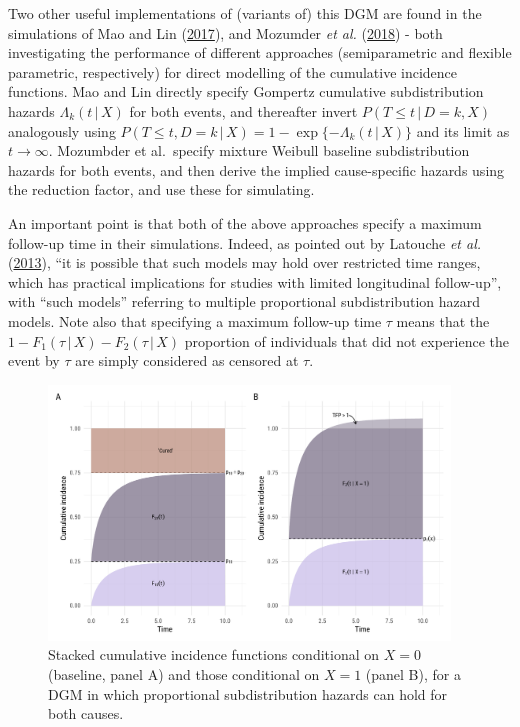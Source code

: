\documentclass[
  letterpaper,
  DIV=11,
  numbers=noendperiod]{scrreprt}
\newcommand{\given}{\,|\,}
\begin{document}
Two other useful implementations of (variants of) this DGM are found in
the simulations of Mao and Lin
(\protect\hyperlink{ref-maoEfficientEstimationSemiparametric2017}{2017}),
and Mozumder \emph{et al.}
(\protect\hyperlink{ref-mozumderDirectLikelihoodInference2018}{2018}) -
both investigating the performance of different approaches
(semiparametric and flexible parametric, respectively) for direct
modelling of the cumulative incidence functions. Mao and Lin directly
specify Gompertz cumulative subdistribution hazards
\(\Lambda_k(t \given X)\) for both events, and thereafter invert
\(P(T \leq t \given D=k, X)\) analogously using
\(P(T \leq t, D=k \given X) = 1 - \exp\{-\Lambda_k(t \given X)\}\) and
its limit as \(t \to \infty\). Mozumbder et al.~specify mixture Weibull
baseline subdistribution hazards for both events, and then derive the
implied cause-specific hazards using the reduction factor, and use these
for simulating.

An important point is that both of the above approaches specify a
maximum follow-up time in their simulations. Indeed, as pointed out by
Latouche \emph{et al.}
(\protect\hyperlink{ref-latoucheCompetingRisksAnalysis2013}{2013}), ``it
is possible that such models may hold over restricted time ranges, which
has practical implications for studies with limited longitudinal
follow-up'', with ``such models'' referring to multiple proportional
subdistribution hazard models. Note also that specifying a maximum
follow-up time \(\tau\) means that the
\(1 - F_1(\tau \given X) - F_2(\tau \given X)\) proportion of
individuals that did not experience the event by \(\tau\) are simply
considered as censored at \(\tau\).

\begin{figure}

{\centering \includegraphics[width=0.95\textwidth,height=\textheight]{chapters/../figures/fine-gray-DGM_twofgs.pdf}

}

\caption{\label{fig-twofgs}Stacked cumulative incidence functions
conditional on \(X = 0\) (baseline, panel A) and those conditional on
\(X = 1\) (panel B), for a DGM in which proportional subdistribution
hazards can hold for both causes.}

\end{figure}
\end{document}
